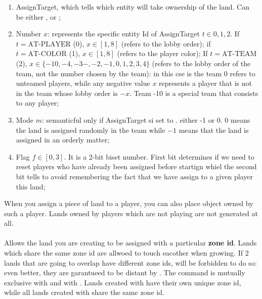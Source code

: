     \begin{enumerate}
        \item AssignTarget, which tells which entity will take ownership of the land. Can be either ,  or ;
        \item Number $x$: represents the specific entity Id of AssignTarget $t \in {0,1,2}$. If $t=\mbox{AT-PLAYER}$ (0), $x \in [1,8]$ (refers to the lobby order); if $t=\mbox{AT-COLOR}$ (1), $x \in [1,8]$ (refers to the player color); If $t=\mbox{AT-TEAM}$ (2), $x \in \{-10,-4,-3-,-2,-1,0,1,2,3,4\}$ (refers to the lobby order of the team, not the number chosen by the team): in this cse is the team 0 refers to unteamed players, while any negative value $x$ represents a player that is not in the team whose lobby order is $-x$. Team -10 is a special team that consists to any player;
        \item Mode $m$: semanticful only if AssignTarget si set to . either -1 or 0. $0$ means the land is assigned randomly in the team while $-1$ means that the land is assigned in an orderly matter;
        \item Flag $f \in [0,3]$. It is a 2-bit biset number. First bit determines if we need to reset players who have already been assigned before startign whiel the second bit tells to avoid remembering the fact that we have assign to a given player this land;
    \end{enumerate}

    When you assign a piece of land to a player, you can also place object owned by such a player. Lands owned by players which are not playing are not generated at all. 

    \paragraph{}

    Allows the land you are creating to be assigned with a particular \textbf{zone id}. Lands which share the same zone id are allwoed to touch eacother when growing. If 2 lands that are going to overlap have different zone ids, will be forbidden to do so: even better, they are garantueed to be distant by . The command is mutually exclusive with  and with . Lands created with  have their own unique zone id, while all lands created with  share the same zone id.

